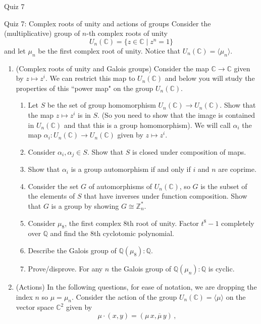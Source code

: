 \documentclass[12pt]{article}
\begin{document}
\begin{quiz}{Quiz 7}
\begin{essay}[response field lines=5,attachments allowed=0]{Quiz 7: Complex roots of unity and actions of groups} 
Consider the (multiplicative) group of $n$-th complex roots of unity
\[U_n(\mathbb{C})=\{z \in \mathbb{C} \mid z^n=1\}\]
and let $\mu_n$ be the first complex root of unity. Notice that $U_n(\mathbb{C})=\langle \mu_n\rangle$.
\begin{enumerate}
\item (Complex roots of unity and Galois groups) Consider the map $\mathbb{C} \to \mathbb{C}$ given by $z \mapsto z^i$. We can restrict this map to $U_n(\mathbb{C})$ and below you will study the properties of this ``power map" on the group $U_n(\mathbb{C})$.
\begin{enumerate}
\item Let $S$ be the set of group homomorphism $U_n(\mathbb{C}) \to U_n(\mathbb{C})$. Show that the map $z \mapsto z^i$ is in $S$. (So you need to show that the image is contained in $U_n(\mathbb{C})$ and that this is a group homomorphism). We will call $\alpha_i$ the map $\alpha_i: U_n(\mathbb{C}) \to U_n(\mathbb{C})$ given by $z \mapsto z^i$.  
    \item  Consider $\alpha_i, \alpha_j \in S$. Show that $S$ is closed under composition of maps.
    \item Show that $\alpha_i$ is a group automorphism if and only if $i$ and $n$ are coprime.
    \item Consider the set $G$ of automorphisms of $U_n(\mathbb{C})$, so $G$ is the subset of the elements of $S$ that have inverses under function composition. Show that $G$ is a group by showing $G \cong \mathbb{Z}_n^*$.
    \item Consider $\mu_8$, the first complex 8th root of unity. Factor $t^8-1$ completely over $\mathbb{Q}$ and find the 8th cyclotomic polynomial.
    \item Describe the Galois group of $\mathbb{Q}(\mu_8):\mathbb{Q}$.
    \item Prove/disprove. For any $n$ the Galois group of $\mathbb{Q}(\mu_n):\mathbb{Q}$ is cyclic.
    \end{enumerate}    
\item (Actions)  In the following questions, for ease of notation, we are dropping the index $n$ so $\mu=\mu_n$. Consider the action of the group $U_n(\mathbb{C})=\langle \mu \rangle$ on the vector space $\mathbb{C}^2$ given by 
\[\mu \cdotp (x , y) = (\mu\,   x , \overline{\mu} \,   y) \, ,\] 

\end{enumerate}
\end{essay}
\end{quiz}
\end{document}
